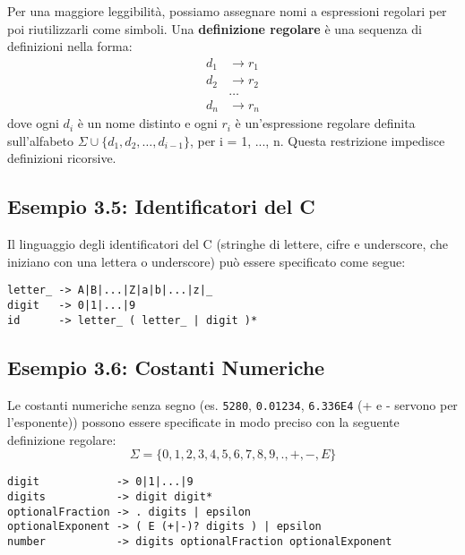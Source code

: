 Per una maggiore leggibilità, possiamo assegnare nomi a espressioni regolari per poi riutilizzarli come simboli. Una \textbf{definizione regolare} è una sequenza di definizioni nella forma:
\begin{align*}
    d_1 & \rightarrow r_1 \\
    d_2 & \rightarrow r_2 \\
    & \dots \\
    d_n & \rightarrow r_n
\end{align*}
dove ogni $d_i$ è un nome distinto e ogni $r_i$ è un'espressione regolare definita sull'alfabeto $\Sigma \cup \{d_1, d_2, \dots, d_{i-1}\}$, per i = 1, ..., n. Questa restrizione impedisce definizioni ricorsive.

\subsection{Esempio 3.5: Identificatori del C}
Il linguaggio degli identificatori del C (stringhe di lettere, cifre e underscore, che iniziano con una lettera o underscore) può essere specificato come segue:
\begin{Verbatim}[frame=single]
letter_ -> A|B|...|Z|a|b|...|z|_
digit   -> 0|1|...|9
id      -> letter_ ( letter_ | digit )*
\end{Verbatim}

\subsection{Esempio 3.6: Costanti Numeriche}
Le costanti numeriche senza segno (es. \texttt{5280}, \texttt{0.01234}, \texttt{6.336E4} (+ e - servono per l’esponente)) possono essere specificate in modo preciso con la seguente definizione regolare:
\[ \Sigma = \{0, 1, 2, 3, 4, 5, 6, 7, 8, 9, ., +, -, E\} \]
\begin{Verbatim}[frame=single]
digit            -> 0|1|...|9
digits           -> digit digit*
optionalFraction -> . digits | epsilon
optionalExponent -> ( E (+|-)? digits ) | epsilon
number           -> digits optionalFraction optionalExponent
\end{Verbatim}

